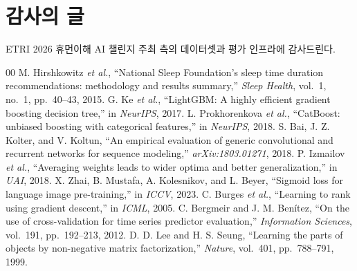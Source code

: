 \documentclass[conference]{IEEEtran}
\begin{document}
\section*{감사의 글}
ETRI 2026 휴먼이해 AI 챌린지 주최 측의 데이터셋과 평가 인프라에 감사드린다.

\begin{thebibliography}{00}
 M. Hirshkowitz \emph{et al.}, ``National Sleep Foundation's sleep time
duration recommendations: methodology and results summary,'' \emph{Sleep Health},
vol.~1, no.~1, pp.~40--43, 2015.
 G. Ke \emph{et al.}, ``LightGBM: A highly efficient gradient
boosting decision tree,'' in \emph{NeurIPS}, 2017.
 L. Prokhorenkova \emph{et al.}, ``CatBoost: unbiased boosting with
categorical features,'' in \emph{NeurIPS}, 2018.
 S. Bai, J. Z. Kolter, and V. Koltun, ``An empirical evaluation of
generic convolutional and recurrent networks for sequence modeling,''
\emph{arXiv:1803.01271}, 2018.
 P. Izmailov \emph{et al.}, ``Averaging weights leads to wider optima and
better generalization,'' in \emph{UAI}, 2018.
 X. Zhai, B. Mustafa, A. Kolesnikov, and L. Beyer, ``Sigmoid loss for
language image pre-training,'' in \emph{ICCV}, 2023.
 C. Burges \emph{et al.}, ``Learning to rank using gradient
descent,'' in \emph{ICML}, 2005.
 C. Bergmeir and J. M. Ben\'itez, ``On the use of cross-validation
for time series predictor evaluation,'' \emph{Information Sciences}, vol.~191,
pp.~192--213, 2012.
 D. D. Lee and H. S. Seung, ``Learning the parts of objects by
non-negative matrix factorization,'' \emph{Nature}, vol.~401, pp.~788--791, 1999.
\end{thebibliography}
\end{document}
